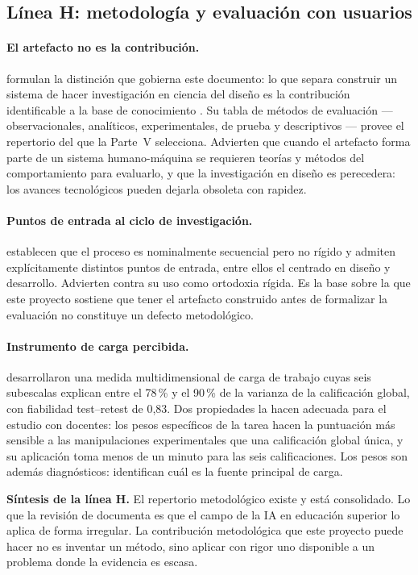 \subsection{Línea H: metodología y evaluación con usuarios}
\label{sec:arte-h}

\paragraph{El artefacto no es la contribución.}
\textcite{hevner2004design} formulan la distinción que gobierna este documento: lo que
separa construir un sistema de hacer investigación en ciencia del diseño es la
contribución identificable a la base de conocimiento \parencite[p.~81]{hevner2004design}.
Su tabla de métodos de evaluación --- observacionales, analíticos,
experimentales, de prueba y descriptivos --- provee el repertorio del que la Parte~V
selecciona. Advierten que cuando el artefacto forma parte de un sistema
humano-máquina se requieren teorías y métodos del comportamiento para evaluarlo, y que
la investigación en diseño es perecedera: los avances tecnológicos pueden dejarla
obsoleta con rapidez.

\paragraph{Puntos de entrada al ciclo de investigación.}
\textcite{peffers2007design} establecen que el proceso es nominalmente secuencial pero
no rígido y admiten explícitamente distintos puntos de entrada, entre ellos el
centrado en diseño y desarrollo. Advierten contra su uso como ortodoxia rígida. Es la
base sobre la que este proyecto sostiene que tener el artefacto construido antes de
formalizar la evaluación no constituye un defecto metodológico.

\paragraph{Instrumento de carga percibida.}
\textcite{hart1988development} desarrollaron una medida multidimensional de carga de
trabajo cuyas seis subescalas explican entre el 78\,\% y el 90\,\% de la varianza de la
calificación global, con fiabilidad test--retest de 0,83. Dos propiedades la hacen
adecuada para el estudio con docentes: los pesos específicos de la tarea hacen la
puntuación más sensible a las manipulaciones experimentales que una calificación
global única, y su aplicación toma menos de un minuto para las seis calificaciones.
Los pesos son además diagnósticos: identifican cuál es la fuente principal de carga.

\begin{estado}
\small
\textbf{Síntesis de la línea H.} El repertorio metodológico existe y está
consolidado. Lo que la revisión de \textcite{bond2024meta} documenta es que el campo
de la IA en educación superior lo aplica de forma irregular. La contribución
metodológica que este proyecto puede hacer no es inventar un método, sino aplicar con
rigor uno disponible a un problema donde la evidencia es escasa.
\end{estado}
